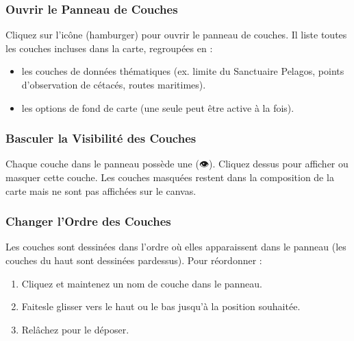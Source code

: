 \documentclass[letterpaper,10pt,english]{sphinxmanual}
\begin{document}
\subsubsection{Ouvrir le Panneau de Couches}
\label{\detokenize{fr/04_explorer_cartes:ouvrir-le-panneau-de-couches}}
\sphinxAtStartPar
Cliquez sur l’icône  (hamburger) pour ouvrir le panneau de couches. Il liste
toutes les couches incluses dans la carte, regroupées en :
\begin{itemize}
\item {} 
\sphinxAtStartPar
{} \textendash{} les couches de données thématiques (ex. limite du
Sanctuaire Pelagos, points d’observation de cétacés, routes maritimes).

\item {} 
\sphinxAtStartPar
{} \textendash{} les options de fond de carte (une seule peut être
active à la fois).

\end{itemize}


\subsubsection{Basculer la Visibilité des Couches}
\label{\detokenize{fr/04_explorer_cartes:basculer-la-visibilite-des-couches}}
\sphinxAtStartPar
Chaque couche dans le panneau possède une  (👁). Cliquez dessus pour
afficher ou masquer cette couche. Les couches masquées restent dans la composition de
la carte mais ne sont pas affichées sur le canvas.


\subsubsection{Changer l’Ordre des Couches}
\label{\detokenize{fr/04_explorer_cartes:changer-l-ordre-des-couches}}
\sphinxAtStartPar
Les couches sont dessinées dans l’ordre où elles apparaissent dans le panneau (les
couches du haut sont dessinées par\sphinxhyphen{}dessus). Pour réordonner :
\begin{enumerate}
%
\item {} 
\sphinxAtStartPar
Cliquez et maintenez un nom de couche dans le panneau.

\item {} 
\sphinxAtStartPar
Faites\sphinxhyphen{}le glisser vers le haut ou le bas jusqu’à la position souhaitée.

\item {} 
\sphinxAtStartPar
Relâchez pour le déposer.

\end{enumerate}
\end{document}
